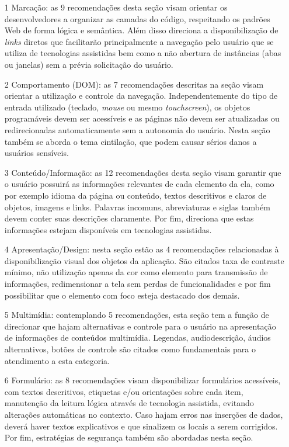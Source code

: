 \documentclass[
	12pt,				%
	oneside,			%
	a4paper,			%
	english,			%
	brazil				%
	]{abntex2ppgsi}
\begin{document}
\begin{itemize}
	\item[1] Marcação: as 9 recomendações desta seção visam orientar os desenvolvedores a organizar as camadas do código, respeitando os padrões Web de forma lógica e semântica. Além disso direciona a disponibilização de \textit{links} diretos que facilitarão principalmente a navegação pelo usuário que se utiliza de tecnologias assistidas bem como a não abertura de instâncias (abas ou janelas) sem a prévia solicitação do usuário.
	
	\item[2] Comportamento (DOM): as 7 recomendações descritas na seção visam orientar a utilização e controle da navegação. Independentemente do tipo de entrada utilizado (teclado, \textit{mouse} ou mesmo \textit{touchscreen}), os objetos programáveis devem ser acessíveis e as páginas não devem ser atualizadas ou redirecionadas automaticamente sem a autonomia do usuário. Nesta seção também se aborda o tema cintilação, que podem causar sérios danos a usuários sensíveis.
	
	\item[3] Conteúdo/Informação: as 12 recomendações desta seção visam garantir que o usuário possuirá as informações relevantes de cada elemento da ela, como por exemplo idioma da página ou conteúdo, textos descritivos e claros de objetos, imagens e links. Palavras incomuns, abreviaturas e siglas também devem conter suas descrições claramente. Por fim, direciona que estas informações estejam disponíveis em tecnologias assistidas.

	\item[4] Apresentação/Design: nesta seção estão as 4 recomendações relacionadas à disponibilização visual dos objetos da aplicação. São citados taxa de contraste mínimo, não utilização apenas da cor como elemento para transmissão de informações, redimensionar a tela sem perdas de funcionalidades e por fim possibilitar que o elemento com foco esteja destacado dos demais.
	
	\item[5] Multimídia: contemplando 5 recomendações, esta seção tem a função de direcionar que hajam alternativas e controle para o usuário na apresentação de informações de conteúdos multimídia. Legendas, audiodescrição, áudios alternativos, botões de controle são citados como fundamentais para o atendimento a esta categoria.	
	
	\item[6] Formulário: as 8 recomendações visam disponibilizar formulários acessíveis, com textos descritivos, etiquetas e/ou orientações sobre cada item, manutenção da leitura lógica através de tecnologia assistida, evitando alterações automáticas no contexto. Caso hajam erros nas inserções de dados, deverá haver textos explicativos e que sinalizem os locais a serem corrigidos. Por fim, estratégias de segurança também são abordadas nesta seção.
	
\end{itemize}
\end{document}

